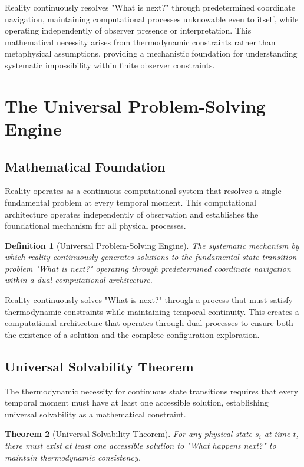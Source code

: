 \documentclass[12pt,a4paper]{article}
\newtheorem{theorem}{Theorem}[section]
\newtheorem{definition}[theorem]{Definition}
\begin{document}
Reality continuously resolves "What is next?" through predetermined coordinate navigation, maintaining computational processes unknowable even to itself, while operating independently of observer presence or interpretation. This mathematical necessity arises from thermodynamic constraints rather than metaphysical assumptions, providing a mechanistic foundation for understanding systematic impossibility within finite observer constraints.
\section{The Universal Problem-Solving Engine}

\subsection{Mathematical Foundation}

Reality operates as a continuous computational system that resolves a single fundamental problem at every temporal moment. This computational architecture operates independently of observation and establishes the foundational mechanism for all physical processes.

\begin{definition}[Universal Problem-Solving Engine]
The systematic mechanism by which reality continuously generates solutions to the fundamental state transition problem "What is next?" operating through predetermined coordinate navigation within a dual computational architecture.
\end{definition}

Reality continuously solves "What is next?" through a process that must satisfy thermodynamic constraints while maintaining temporal continuity. This creates a computational architecture that operates through dual processes to ensure both the existence of a solution and the complete configuration exploration.

\subsection{Universal Solvability Theorem}

The thermodynamic necessity for continuous state transitions requires that every temporal moment must have at least one accessible solution, establishing universal solvability as a mathematical constraint.

\begin{theorem}[Universal Solvability Theorem]
For any physical state $s_i$ at time $t$, there must exist at least one accessible solution to "What happens next?" to maintain thermodynamic consistency.
\end{theorem}
\end{document}
